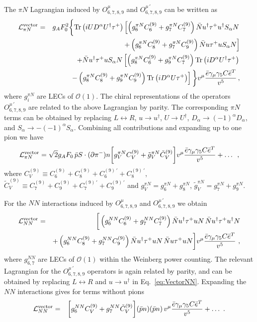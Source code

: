 \documentclass[letterpaper,11pt]{article}
\newcommand{\al}{\alpha}
\newcommand{\g}{\gamma}
\newcommand{\vL}{\ensuremath{\mathcal{L}}}
\newcommand{\bea}{\begin{eqnarray}}
\newcommand{\eea}{\end{eqnarray}}
\newcommand{\Or}{\mathcal O}
\newcommand{\sq}{^{2}}
\newcommand{\nn}{\nonumber}
\begin{document}
The $\pi N$ Lagrangian induced by $O_{6,7,8,9}^{\mu}$ and $O_{6,7,8,9}^{\mu\, \prime}$ can be written as
\bea\label{eq:vectorPiN}
\vL^{\rm vector}_{\pi N}&=&g_A F_0\sq \bigg\{ 
{\rm Tr}\left(i UD^\al U^\dagger\tau^+\right)\left[ \left(g_6^{\pi N} C^{(9)}_{6} + g_{7}^{\pi N} C^{(9)}_{7} \right)\bar N u^\dagger \tau^+u^\dagger S_\al N \right. \nn \\ & &\left. 
+ \left(g_6^{\pi N} C^{(9)}_{8} + g_{7}^{\pi N} C^{(9)}_{9} \right) \bar N u\tau^+u S_\al N\right]
\nn\\
&&+
\bar N u^\dagger \tau^+u S_\al N\left[ \left( g_8^{\pi N} C^{(9)}_{6} +  g_{9}^{\pi N} C^{(9)}_{7} \right) {\rm Tr}\left(i D^\al U^\dagger \tau^+\right)
\right. \nn \\ & & \left. - \left( g_8^{\pi N} C^{(9)}_{8} +  g_{9}^{\pi N} C^{(9)}_{9} \right) {\rm Tr}\left(i D^\al U \tau^+\right)\right] 
\bigg\}v^\mu \frac{\bar e \g_\mu \g_5 C\bar e^T}{v^5}\,,
\eea
where $g_{ i}^{\pi N}$  are LECs of $\Or(1)$. The chiral representations of the operators $O_{6,7,8,9}^{\mu\, \prime}$ are related to the above Lagrangian by parity. The corresponding $\pi N$ terms can be obtained by replacing $L\leftrightarrow R$, $u\to u^\dagger$, $U\to U^\dagger$,  $D_\al \to  (-1)^\al  D_\al$,  and $S_\al\to - (-1)^\al S_\al$.
Combining all contributions and expanding up to one pion we have
\bea \label{eq:vectorPiN2}
\vL^{\rm vector}_{\pi N} = \sqrt{2}g_A F_0\,\bar p S\cdot (\partial \pi^-) n \bigg[ g_V^{\pi N}C^{(9)}_V+ \tilde{g}_{V}^{\pi N} \tilde{C}^{(9)}_V \bigg]v^\mu \frac{\bar e \g_\mu \g_5 C\bar e^T}{v^5} +\dots\,\,\,,
\eea
where $C_V^{(9)}\equiv C_{6}^{(9)}+C_{8}^{(9)}+C_{6}^{(9)\, \prime}+C_{8}^{(9)\, \prime}$,  
$\tilde{C}_V^{(9)} \equiv C_{7}^{(9)}+C_{9}^{(9)}+C_{7}^{(9)\, \prime}+C_{9}^{(9)\, \prime}$
and $g_{V}^{\pi N}=g_{6}^{\pi N}+g_{8}^{\pi N}$, $\tilde{g}_{V}^{\pi N}=g_{7}^{\pi N}+g_{9}^{\pi N}$.



For the $N\!N$ interactions induced by $O_{6,7,8,9}^{\mu}$ and $O_{6,7,8,9}^{\mu\, \prime}$ we obtain
\bea\label{eq:VectorNN}
\vL_{NN}^{\rm vector} &=&\bigg[
\left(g_6^{NN}C^{(9)}_{6}+g^{NN}_7 C^{(9)}_{7}\right)\bar Nu^\dagger \tau^+ u N\, \bar Nu^\dagger \tau^+ u^\dagger N
\nn\\
&&
+\left(g_6^{NN}C^{(9)}_{8}+g^{NN}_7 C_{9}^{(9)}\right)\bar Nu^\dagger \tau^+ u N\, \bar Nu\tau^+ u N\bigg] v^\mu \frac{\bar e \g_\mu \g_5 C\bar e^T}{v^5}\,\,,
\eea
where $g^{NN}_{6,7}$ are LECs of $\Or(1)$ within the Weinberg power counting.
The relevant Lagrangian for the  $O_{6,7,8,9}^{\mu\, \prime}$  operators is again related by parity, and can be obtained by replacing $L\leftrightarrow R$ and $u\to u^\dagger$ in Eq.\ \eqref{eq:VectorNN}. Expanding the $N\!N$ interactions  gives for terms without pions
\bea\label{vecNN}
\vL_{NN}^{\rm vector} &=&\bigg[g_6^{NN}C^{(9)}_{V}+g_7^{NN} \tilde C^{(9)}_{V}\bigg] (\bar p n)(\bar p n)\,v^\mu \frac{\bar e \g_\mu \g_5 C\bar e^T}{v^5}+\dots\,\,.
\eea
\end{document}
